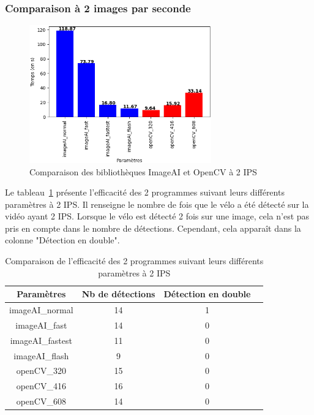\subsubsection{Comparaison à 2 images par seconde}
\label{sec:comparaisonIA:resultats:2fps}

\begin{figure}[H]
    \centering
    \includegraphics[width=0.7\textwidth]{img/result_2fps.png}
    \caption{Comparaison des bibliothèques ImageAI et OpenCV à 2 IPS}
\end{figure}

Le tableau~\ref{tab_2fps} présente l'efficacité des 2 programmes suivant leurs différents paramètres à 2 IPS.
Il renseigne le nombre de fois que le vélo a été détecté sur la vidéo ayant 2 IPS.
Lorsque le vélo est détecté 2 fois sur une image, cela n'est pas pris en compte dans le nombre de détections.
Cependant, cela apparaît dans la colonne "Détection en double".

\begin{table}[H]
    \centering
    \begin{tabular}{|c|c|c|c|}
        \hline
        \rowcolor{tableColorDark} Paramètres & Nb de détections & Détection en double \\
        \hline

        imageAI\_normal                      & 14               & 1                   \\\hline
        imageAI\_fast                        & 14               & 0                   \\\hline
        imageAI\_fastest                     & 11               & 0                   \\\hline
        imageAI\_flash                       & 9                & 0                   \\\hline
        openCV\_320                          & 15               & 0                   \\\hline
        openCV\_416                          & 16               & 0                   \\\hline
        openCV\_608                          & 14               & 0                   \\\hline
    \end{tabular}
    \caption{Comparaison de l'efficacité des 2 programmes suivant leurs différents paramètres à 2 IPS}
    \label{tab_2fps}
\end{table}

